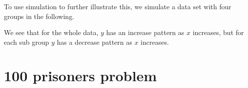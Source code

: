 To use simulation to further illustrate this, we simulate a data set with four groups in the following.

We see that for the whole data, $y$ has an increase pattern as $x$ increases, but for each sub group $y$ has a decrease pattern as $x$ increases.

\hypertarget{prisoners-problem}{%
\section{100 prisoners problem}\label{prisoners-problem}}


